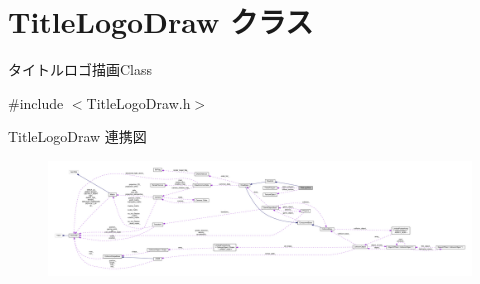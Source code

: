 \hypertarget{class_title_logo_draw}{}\section{Title\+Logo\+Draw クラス}
\label{class_title_logo_draw}


タイトルロゴ描画\+Class  




{\ttfamily \#include $<$Title\+Logo\+Draw.\+h$>$}



Title\+Logo\+Draw 連携図\nopagebreak
\begin{figure}[H]
\begin{center}
\leavevmode
\includegraphics[width=350pt]{class_title_logo_draw__coll__graph}
\end{center}
\end{figure}
